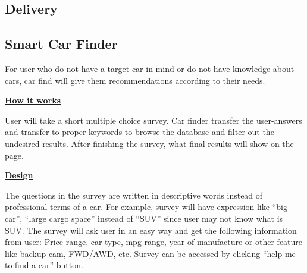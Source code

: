 \documentclass[12pt]{article}
\begin{document}
\subsection{Delivery}

\subsection{Smart Car Finder}
For user who do not have a target car in mind or do not have knowledge about cars, car find will give them recommendations according to their needs.\par
\textbf{\underline{How it works}}\par
User will take a short multiple choice survey. Car finder transfer the user-answers and transfer to proper keywords to browse the database and filter out the undesired results. After finishing the survey, what final results will show on the page.\par
\textbf{\underline{Design}}\par
The questions in the survey are written in descriptive words instead of professional terms of a car. For example, survey will have expression like ``big car'', ``large cargo space'' instead of ``SUV'' since user may not know what is SUV. The survey will ask user in an easy way and get the following information from user: Price range, car type, mpg range, year of manufacture or other feature like backup cam, FWD/AWD, etc. Survey can be accessed by clicking ``help me to find a car'' button. 
\end{document}
